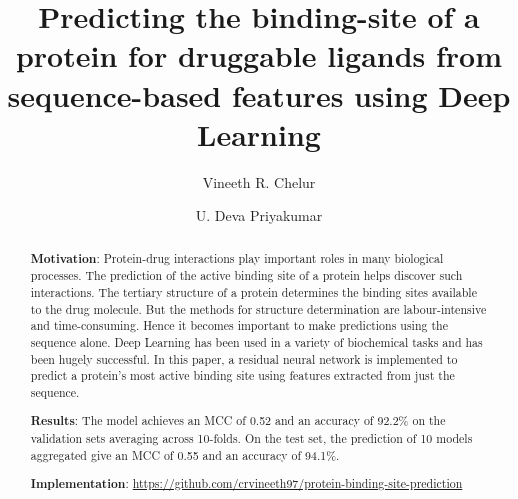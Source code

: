 \documentclass[journal=jacsat,manuscript=article]{achemso}
\author{Vineeth R. Chelur}
\author{U. Deva Priyakumar}
\affiliation[IIIT-H]
{Center for Computational Natural Sciences \& Bioinformatics, IIIT-H, Hyderabad}
\title[Predicting the binding-site of a protein for druggable ligands from sequence-based features using Deep Learning]
  {Predicting the binding-site of a protein for druggable ligands from sequence-based features using Deep Learning
  }
\begin{document}






\begin{abstract}
    \noindent\textbf{Motivation}: Protein-drug interactions play important roles in many biological processes. The prediction of the active binding site of a protein helps discover such interactions. The tertiary structure of a protein determines the binding sites available to the drug molecule. But the methods for structure determination are labour-intensive and time-consuming. Hence it becomes important to make predictions using the sequence alone. Deep Learning has been used in a variety of biochemical tasks and has been hugely successful. In this paper, a residual neural network is implemented to predict a protein's most active binding site using features extracted from just the sequence.

    \noindent\textbf{Results}: The model achieves an MCC of 0.52 and an accuracy of 92.2\% on the validation sets averaging across 10-folds. On the test set, the prediction of 10 models aggregated give an MCC of 0.55 and an accuracy of 94.1\%.

    \noindent\textbf{Implementation}: \href{https://github.com/crvineeth97/protein-binding-site-prediction}{https://github.com/crvineeth97/protein-binding-site-prediction}
\end{abstract}
\end{document}
